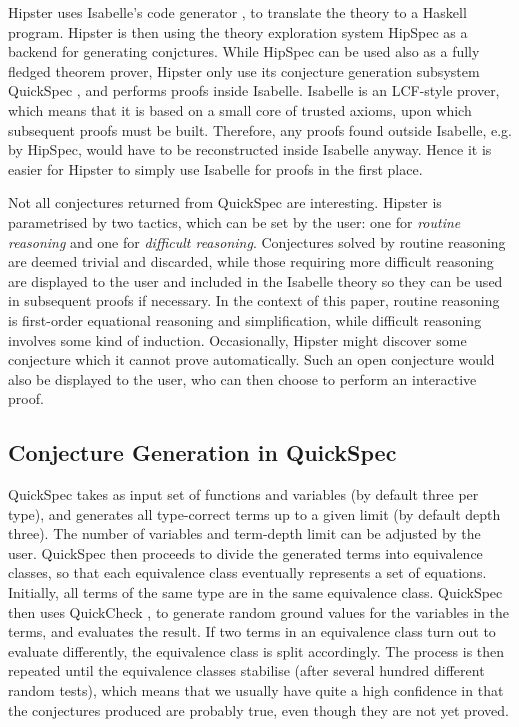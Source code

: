 Hipster uses Isabelle's code generator \cite{codegen}, to translate the theory to a Haskell program. Hipster is then using the theory exploration system HipSpec as a backend for generating conjctures. While HipSpec can be used also as a fully fledged theorem prover, Hipster only use its conjecture generation subsystem QuickSpec \cite{quickspec}, and performs proofs inside Isabelle. Isabelle is an LCF-style prover, which means that it is based on a small core of trusted axioms, upon which subsequent proofs must be built. Therefore, any proofs found outside Isabelle, e.g. by HipSpec, would have to be reconstructed inside Isabelle anyway. Hence it is easier for Hipster to simply use Isabelle for proofs in the first place. 

Not all conjectures returned from QuickSpec are interesting. Hipster is parametrised by two tactics, which can be set by the user: one for \emph{routine reasoning} and one for \emph{difficult reasoning}. Conjectures solved by routine reasoning are deemed trivial and discarded, while those requiring more difficult reasoning are displayed to the user and included in the Isabelle theory so they can be used in subsequent proofs if necessary. In the context of this paper, routine reasoning is first-order equational reasoning and simplification, while difficult reasoning involves some kind of induction. Occasionally, Hipster might discover some conjecture which it cannot prove automatically. Such an open conjecture would also be displayed to the user, who can then choose to perform an interactive proof.

\subsection{Conjecture Generation in QuickSpec}
QuickSpec takes as input set of functions and variables (by default three per type), and generates all type-correct terms up to a given limit (by default depth three). The number of variables and term-depth limit can be adjusted by the user. QuickSpec then proceeds to divide the generated terms into equivalence classes, so that each equivalence class eventually represents a set of equations. Initially, all terms of the same type are in the same equivalence class. QuickSpec then uses QuickCheck \cite{quickcheck}, to generate random ground values for the variables in the terms, and evaluates the result. If two terms in an equivalence class turn out to evaluate differently, the equivalence class is split accordingly. The process is then repeated until the equivalence classes stabilise (after several hundred different random tests), which means that we usually have quite a high confidence in that the conjectures produced are probably true, even though they are not yet proved.  


